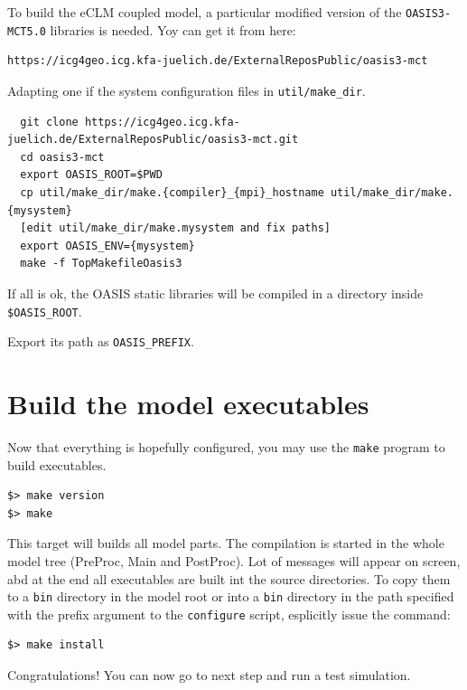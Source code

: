 To build the eCLM coupled model, a particular modified version of the
\verb=OASIS3-MCT5.0= libraries is needed. Yoy can get it from here:

\begin{verbatim}
https://icg4geo.icg.kfa-juelich.de/ExternalReposPublic/oasis3-mct
\end{verbatim}

Adapting one if the system configuration files in \verb=util/make_dir=.

\begin{verbatim}
  git clone https://icg4geo.icg.kfa-juelich.de/ExternalReposPublic/oasis3-mct.git
  cd oasis3-mct
  export OASIS_ROOT=$PWD
  cp util/make_dir/make.{compiler}_{mpi}_hostname util/make_dir/make.{mysystem}
  [edit util/make_dir/make.mysystem and fix paths]
  export OASIS_ENV={mysystem}
  make -f TopMakefileOasis3
\end{verbatim}

If all is ok, the OASIS static libraries will be compiled in a directory
inside \verb=$OASIS_ROOT=.

Export its path as \verb=OASIS_PREFIX=.

\section{Build the model executables}

Now that everything is hopefully configured, you may use the \verb=make=
program to build executables.

\begin{Verbatim}
$> make version
$> make
\end{Verbatim}

This target will builds all model parts. 
The compilation is started in the whole model tree (PreProc, Main and PostProc).
Lot of messages will appear on screen, abd at the end all executables are built
int the source directories.
To copy them to a \verb=bin= directory in the model root or into a \verb=bin=
directory in the path specified with the prefix argument to the \verb=configure=
script, esplicitly issue the command:

\begin{Verbatim}
$> make install
\end{Verbatim}

Congratulations! You can now go to next step and run a test simulation.
